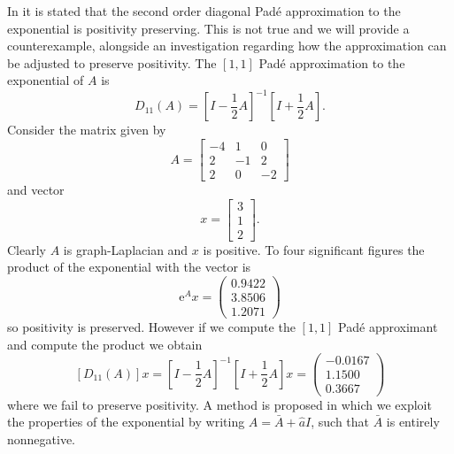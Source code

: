 In \cite{blanes_pos_2022} it is stated that the second order diagonal Pad\'e approximation to the exponential is positivity preserving.
This is not true and we will provide a counterexample, alongside an investigation regarding how the approximation can be adjusted to preserve positivity.
The $[1,1]$ Pad\'e approximation to the exponential of $A$ is
\begin{equation*}
    D_{11}(A) = \left[ I - \frac{1}{2}A \right]^{-1} \left[ I + \frac{1}{2} A\right].
\end{equation*}
Consider the matrix given by
\begin{equation*}
    A = \begin{bmatrix}
        -4 & 1 & 0 \\
        2 & -1 & 2 \\
        2 & 0 & -2
    \end{bmatrix}
\end{equation*}
and vector
\begin{equation*}
    x = \begin{bmatrix}
        3 \\
        1 \\
        2
    \end{bmatrix}.
\end{equation*}
Clearly $A$ is graph-Laplacian and $x$ is positive.
To four significant figures the product of the exponential with the vector is
\begin{equation}
    \mathrm{e}^{A} x = \begin{pmatrix}
        0.9422 \\
        3.8506 \\
        1.2071
    \end{pmatrix}
\end{equation}
so positivity is preserved. However if we compute the $[1,1]$ Pad\'e approximant and compute the product we obtain
\begin{equation*}
    \left[D_{11}(A)\right]x = \left[ I - \frac{1}{2}A \right]^{-1} \left[ I + \frac{1}{2}A \right] x = \begin{pmatrix}
        -0.0167 \\
        1.1500 \\
        0.3667
    \end{pmatrix}
\end{equation*}
where we fail to preserve positivity.
A method is proposed in which we exploit the properties of the exponential by writing $A = \bar{A} + \hat{a}I$, such that $\bar{A}$ is entirely nonnegative.

